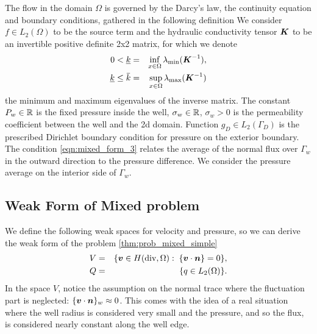 The flow in the domain $\Omega$ is governed by the Darcy's law, the continuity equation and
boundary conditions, gathered in the following definition
We consider $f\in L_2(\Omega)$ to be the source term and the hydraulic conductivity tensor $\mathbf{\boldsymbol{K}}$ to be an invertible
positive definite 2x2 matrix, for which we denote
\begin{eqnarray}
    0 < \underline{k} &=& \inf\limits_{x\in\Omega}\lambda_{\min}(\vc K^{-1}),\\
    \underline{k} \leq \overbar{k} &=& \sup\limits_{x\in\Omega}\lambda_{\max}(\vc K^{-1})
\end{eqnarray}
the minimum and maximum eigenvalues of the inverse matrix.
The constant $P_w\in\mathbb{R}$ is the fixed pressure inside the well, $\sigma_w\in\mathbb{R}$, $\sigma_w>0$ is the
permeability coefficient between the well and the 2d domain. Function $g_D\in L_2(\Gamma_D)$ is the 
prescribed Dirichlet boundary condition for pressure on the exterior boundary.
The condition \eqref{eqn:mixed_form_3} relates the average of the normal flux over $\Gamma_w$ in the outward direction
to the pressure difference. We consider the pressure average on the interior side of $\Gamma_w$.

\subsection{Weak Form of Mixed problem}
We define the following weak spaces for velocity and pressure,
so we can derive the weak form of the problem \eqref{thm:prob_mixed_simple}
\begin{eqnarray}    
    V &=& \{\vc v\in H(\div,\Omega):\; \fluct{\vc v\cdot\vc n} = 0\}, \label{eqn:space_V}\\
    Q &=& \{q \in L_2(\Omega) %
          \}. \label{eqn:space_Q}
\end{eqnarray}
In the space $V$, notice the assumption on the normal trace where the fluctuation part is neglected: $\{\mathbf{\boldsymbol{v}}\cdot \mathbf{\boldsymbol{n}}\}_w \approx 0$.
This comes with the idea of a real situation where the well radius is considered very small and the pressure, and so the flux,
is considered nearly constant along the well edge.

